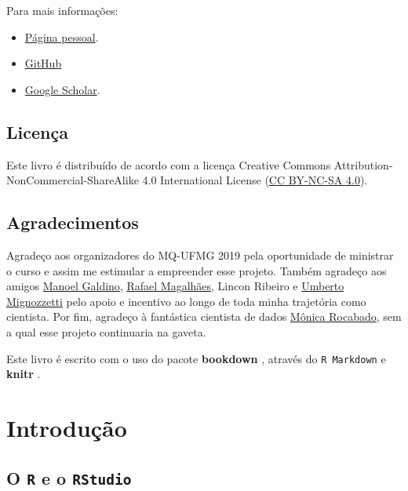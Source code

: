\documentclass[]{book}
\begin{document}
Para mais informações:

\begin{itemize}
\item
  \href{https://davimoreira.com/}{Página pessoal}.
\item
  \href{https://github.com/davi-moreira}{GitHub}
\item
  \href{https://scholar.google.com.br/citations?hl=pt-BR\&user=dS9bbdMAAAAJ}{Google Scholar}.
\end{itemize}

\hypertarget{licenuxe7a}{%
\section*{Licença}\label{licenuxe7a}}

Este livro é distribuído de acordo com a licença Creative Commons Attribution-NonCommercial-ShareAlike 4.0 International License (\href{https://creativecommons.org/licenses/by-nc-sa/4.0/}{CC BY-NC-SA 4.0}).

\hypertarget{agradecimentos}{%
\section*{Agradecimentos}\label{agradecimentos}}

Agradeço aos organizadores do MQ-UFMG 2019 pela oportunidade de ministrar o curso e assim me estimular a empreender esse projeto. Também agradeço aos amigos \href{https://sites.google.com/site/galdinomcz/}{Manoel Galdino}, \href{http://lattes.cnpq.br/8040086656965973}{Rafael Magalhães}, Lincon Ribeiro e \href{https://umbertomig.com/}{Umberto Mignozzetti} pelo apoio e incentivo ao longo de toda minha trajetória como cientista. Por fim, agradeço à fantástica cientista de dados \href{https://rdados.netlify.app/}{Mônica Rocabado}, sem a qual esse projeto continuaria na gaveta.

Este livro é escrito com o uso do pacote \textbf{bookdown} \citep{R-bookdown}, através do \texttt{R\ Markdown} e \textbf{knitr} \citep{xie2015}.

\hypertarget{intro}{%
\chapter{Introdução}\label{intro}}

\hypertarget{o-r-e-o-rstudio}{%
\section{\texorpdfstring{O \texttt{R} e o \texttt{RStudio}}{O R e o RStudio}}\label{o-r-e-o-rstudio}}
\end{document}
